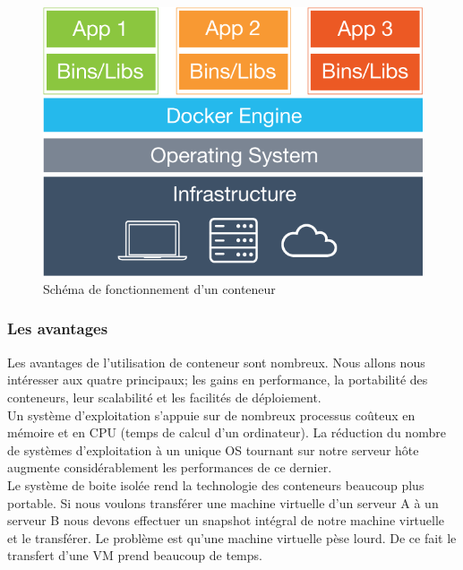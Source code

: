       \begin{figure}
        \begin{center}
          \includegraphics[scale=0.2]{images/container.png}
        \end{center}
        \caption{Schéma de fonctionnement d'un conteneur}
        \label{Container}
      \end{figure}

      \subsubsection{Les avantages}
      Les avantages de l’utilisation de conteneur sont nombreux. Nous allons nous intéresser aux quatre principaux; les gains en performance, la portabilité des conteneurs, leur scalabilité et les facilités de déploiement.\\

      Un système d’exploitation s’appuie sur de nombreux processus coûteux en mémoire et en CPU (temps de calcul d’un ordinateur). La réduction du nombre de systèmes d’exploitation à un unique OS tournant sur notre serveur hôte augmente considérablement les performances de ce dernier.\\

      Le système de boite isolée rend la technologie des conteneurs beaucoup plus portable. Si nous voulons transférer une machine virtuelle d’un serveur A à un serveur B nous devons effectuer un snapshot intégral de notre machine virtuelle et le transférer. Le problème est qu’une machine virtuelle pèse lourd. De ce fait le transfert d’une VM prend beaucoup de temps.\\

